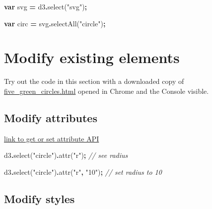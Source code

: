 \documentclass[
  openany]{book}
\newenvironment{Shaded}{\begin{snugshade}}{\end{snugshade}}
\newcommand{\CommentTok}[1]{\textcolor[rgb]{0.56,0.35,0.01}{\textit{#1}}}
\newcommand{\FunctionTok}[1]{\textcolor[rgb]{0.00,0.00,0.00}{#1}}
\newcommand{\KeywordTok}[1]{\textcolor[rgb]{0.13,0.29,0.53}{\textbf{#1}}}
\newcommand{\NormalTok}[1]{#1}
\newcommand{\OperatorTok}[1]{\textcolor[rgb]{0.81,0.36,0.00}{\textbf{#1}}}
\newcommand{\StringTok}[1]{\textcolor[rgb]{0.31,0.60,0.02}{#1}}
\begin{document}
\begin{Shaded}
\begin{Highlighting}[]
\KeywordTok{var}\NormalTok{ svg }\OperatorTok{=}\NormalTok{ d3}\OperatorTok{.}\FunctionTok{select}\NormalTok{(}\StringTok{"svg"}\NormalTok{)}\OperatorTok{;}

\KeywordTok{var}\NormalTok{ circ }\OperatorTok{=}\NormalTok{ svg}\OperatorTok{.}\FunctionTok{selectAll}\NormalTok{(}\StringTok{"circle"}\NormalTok{)}\OperatorTok{;}
\end{Highlighting}
\end{Shaded}

\hypertarget{modify-existing-elements}{%
\section{\texorpdfstring{Modify existing elements }{Modify existing elements }}\label{modify-existing-elements}}

Try out the code in this section with a downloaded copy of \href{https://raw.githubusercontent.com/jtr13/d3book/master/code/five_green_circles.html}{five\_green\_circles.html} opened in Chrome and the Console visible.

\hypertarget{modify-attributes}{%
\subsection{Modify attributes}\label{modify-attributes}}

\href{https://github.com/d3/d3-selection/blob/v1.4.0/README.md\#selection_attr}{link to get or set attribute API}

\begin{Shaded}
\begin{Highlighting}[]
\NormalTok{d3}\OperatorTok{.}\FunctionTok{select}\NormalTok{(}\StringTok{"circle"}\NormalTok{)}\OperatorTok{.}\FunctionTok{attr}\NormalTok{(}\StringTok{"r"}\NormalTok{)}\OperatorTok{;}           \CommentTok{// see radius}

\NormalTok{d3}\OperatorTok{.}\FunctionTok{select}\NormalTok{(}\StringTok{"circle"}\NormalTok{)}\OperatorTok{.}\FunctionTok{attr}\NormalTok{(}\StringTok{"r"}\OperatorTok{,} \StringTok{"10"}\NormalTok{)}\OperatorTok{;}     \CommentTok{// set radius to 10}
\end{Highlighting}
\end{Shaded}

\hypertarget{modify-styles}{%
\subsection{Modify styles}\label{modify-styles}}
\end{document}
